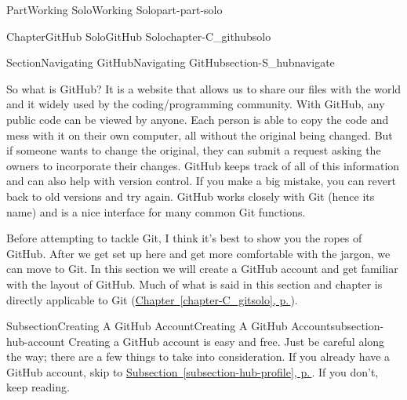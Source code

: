 \documentclass[twoside,10pt,]{book}
\newcommand{\xreffont}{\relax}
\begin{document}
\begin{partptx}{Part}{Working Solo}{}{Working Solo}{}{}{part-part-solo}
\renewcommand*{\partname}{Part}
%
\typeout{************************************************}
\typeout{************************************************}
%
\begin{chapterptx}{Chapter}{GitHub Solo}{}{GitHub Solo}{}{}{chapter-C_githubsolo}
\renewcommand*{\chaptername}{Chapter}
%
%
\typeout{************************************************}
\typeout{************************************************}
%
\begin{sectionptx}{Section}{Navigating GitHub}{}{Navigating GitHub}{}{}{section-S_hubnavigate}
%
%
\begin{introduction}{}%
So what is GitHub? It is a website that allows us to share our files with the world and it widely used by the coding\slash{}programming community. With GitHub, any public code can be viewed by anyone. Each person is able to copy the code and mess with it on their own computer, all without the original being changed. But if someone wants to change the original, they can submit a request asking the owners to incorporate their changes. GitHub keeps track of all of this information and can also help with version control. If you make a big mistake, you can revert back to old versions and try again. GitHub works closely with Git (hence its name) and is a nice interface for many common Git functions.%
\par
Before attempting to tackle Git, I think it's best to show you the ropes of GitHub. After we get set up here and get more comfortable with the jargon, we can move to Git. In this section we will create a GitHub account and get familiar with the layout of GitHub. Much of what is said in this section and chapter is directly applicable to Git (\hyperref[chapter-C_gitsolo]{Chapter~{\xreffont\ref{chapter-C_gitsolo}}, p.\,\pageref{chapter-C_gitsolo}}).%
\end{introduction}%
%
%
\typeout{************************************************}
\typeout{************************************************}
%
\begin{subsectionptx}{Subsection}{Creating A GitHub Account}{}{Creating A GitHub Account}{}{}{subsection-hub-account}
%
%
Creating a GitHub account is easy and free. Just be careful along the way; there are a few things to take into consideration. If you already have a GitHub account, skip to \hyperref[subsection-hub-profile]{Subsection~{\xreffont\ref{subsection-hub-profile}}, p.\,\pageref{subsection-hub-profile}}. If you don't, keep reading.%

\end{subsectionptx}
\end{sectionptx}
\end{chapterptx}
\end{partptx}
\end{document}
